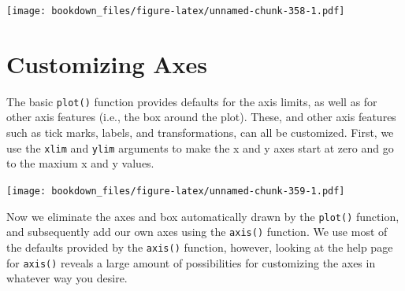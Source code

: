 \documentclass[]{krantz}
\makeatletter
\newenvironment{Shaded}{\begin{snugshade}}{\end{snugshade}}
\newcommand{\KeywordTok}[1]{\textcolor[rgb]{0.27,0.27,0.27}{\textbf{#1}}}
\newcommand{\DataTypeTok}[1]{\textcolor[rgb]{0.27,0.27,0.27}{#1}}
\newcommand{\DecValTok}[1]{\textcolor[rgb]{0.06,0.06,0.06}{#1}}
\newcommand{\StringTok}[1]{\textcolor[rgb]{0.5,0.5,0.5}{#1}}
\newcommand{\OperatorTok}[1]{\textcolor[rgb]{0.43,0.43,0.43}{\textbf{#1}}}
\newcommand{\NormalTok}[1]{#1}
\newenvironment{kframe}{%
\medskip{}
\setlength{\fboxsep}{.8em}
 \def\at@end@of@kframe{}%
 \ifinner\ifhmode%
  \def\at@end@of@kframe{\end{minipage}}%
  \begin{minipage}{\columnwidth}%
 \fi\fi%
 \def\FrameCommand##1{\hskip\@totalleftmargin \hskip-\fboxsep
 \colorbox{shadecolor}{##1}\hskip-\fboxsep
     \hskip-\linewidth \hskip-\@totalleftmargin \hskip\columnwidth}%
 \MakeFramed {\advance\hsize-\width
   \@totalleftmargin\z@ \linewidth\hsize
   \@setminipage}}%
 {\par\unskip\endMakeFramed%
 \at@end@of@kframe}
\renewenvironment{Shaded}{\begin{kframe}}{\end{kframe}}
\makeatother
\begin{document}
\texttt{[image: bookdown\_files/figure-latex/unnamed-chunk-358-1.pdf]}

\section{Customizing Axes}\label{customizing-axes-1}

The basic \texttt{plot()} function provides defaults for the axis
limits, as well as for other axis features (i.e., the box around the
plot). These, and other axis features such as tick marks, labels, and
transformations, can all be customized. First, we use the \texttt{xlim}
and \texttt{ylim} arguments to make the x and y axes start at zero and
go to the maxium x and y values.

\begin{Shaded}
\end{Shaded}

\texttt{[image: bookdown\_files/figure-latex/unnamed-chunk-359-1.pdf]}

Now we eliminate the axes and box automatically drawn by the
\texttt{plot()} function, and subsequently add our own axes using the
\texttt{axis()} function. We use most of the defaults provided by the
\texttt{axis()} function, however, looking at the help page for
\texttt{axis()} reveals a large amount of possibilities for customizing
the axes in whatever way you desire.
\end{document}
